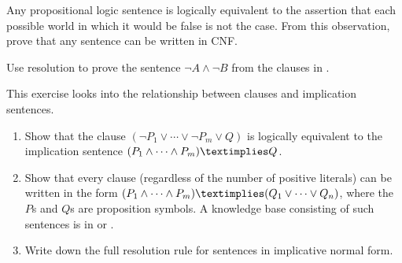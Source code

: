 
\begin{exercise}
Any propositional logic sentence is logically equivalent to the 
assertion that each possible world in which it would be false 
is not the case. From this observation, prove that any sentence can be written in CNF.
\end{exercise} 



\begin{exercise}
Use resolution to prove the sentence \(\lnot A \land \lnot B\) from the clauses in
.
\end{exercise} 

\begin{exercise}
This exercise looks into the relationship between clauses and implication sentences.
\begin{enumerate}
\item Show that the clause \((\lnot P_1 \lor \cdots \lor \lnot P_m \lor Q)\)
is logically equivalent to the implication sentence \((P_1 \land \cdots \land P_m) \textimplies Q\).
\item Show that every clause (regardless of the number of positive literals) can be written
in the form \((P_1 \land \cdots \land P_m) \textimplies (Q_1 \lor \cdots \lor Q_n)\),
where the \(P\)s and \(Q\)s are proposition symbols.
A knowledge base consisting of such sentences is 
in 
or   \cite{Kowalski:1979}.
\item Write down the full resolution rule for sentences in implicative normal form.
\end{enumerate}
\end{exercise} 


